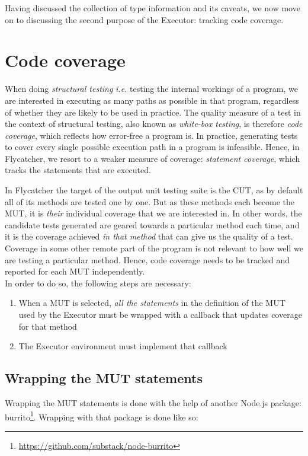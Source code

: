 Having discussed the collection of type information and its caveats, we now move on to discussing the second purpose of the \textsf{Executor}: tracking code coverage.

\section{Code coverage}

When doing \emph{structural testing} \emph{i.e.} testing the internal workings of a program, we are interested in executing as many paths as possible in that program, regardless of whether they are likely to be used in practice. The quality measure of a test in the context of structural testing, also known as \emph{white-box testing}, is therefore \emph{code coverage}, which reflects how error-free a program is. In practice, generating tests to cover every single possible execution path in a program is infeasible. Hence, in \textsf{Flycatcher}, we resort to a weaker measure of coverage: \emph{statement coverage}, which tracks the statements that are executed.

In \textsf{Flycatcher} the target of the output unit testing suite is the CUT, as by default all of its methods are tested one by one. But as these methods each become the MUT, it is \emph{their} individual coverage that we are interested in. In other words, the candidate tests generated are geared towards a particular method each time, and it is the coverage achieved \emph{in that method} that can give us the quality of a test. Coverage in some other remote part of the program is not relevant to how well we are testing a particular method. Hence, code coverage needs to be tracked and reported for each MUT independently.\\

In order to do so, the following steps are necessary:
\begin{enumerate}
   \item When a MUT is selected, \emph{all the statements} in the definition of the MUT used by the \textsf{Executor} must be wrapped with a callback that updates coverage for that method
   \item The \textsf{Executor} environment must implement that callback
\end{enumerate}

\subsection{Wrapping the MUT statements}
Wrapping the MUT statements is done with the help of another \textsf{Node.js} package: \textsf{burrito}\footnote{\url{https://github.com/substack/node-burrito}}. Wrapping with that package is done like so:

